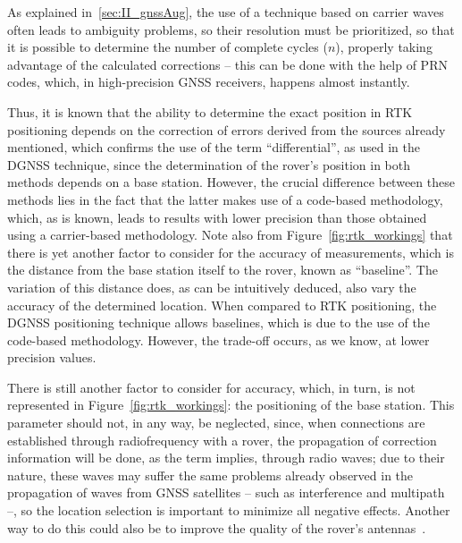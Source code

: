 As explained in~\ref{sec:II_gnssAug}, the use of a technique based on carrier waves often leads to ambiguity problems, so their resolution must be prioritized, so that it is possible to determine the number of complete cycles ($n$), properly taking advantage of the calculated corrections -- this can be done with the help of PRN codes, which, in high-precision GNSS receivers, happens almost instantly.

Thus, it is known that the ability to determine the exact position in RTK positioning depends on the correction of errors derived from the sources already mentioned, which confirms the use of the term ``differential'', as used in the DGNSS technique, since the determination of the rover's position in both methods depends on a base station. However, the crucial difference between these methods lies in the fact that the latter makes use of a code-based methodology, which, as is known, leads to results with lower precision than those obtained using a carrier-based methodology. Note also from Figure~\ref{fig:rtk_workings} that there is yet another factor to consider for the accuracy of measurements, which is the distance from the base station itself to the rover, known as ``baseline''. The variation of this distance does, as can be intuitively deduced, also vary the accuracy of the determined location. When compared to RTK positioning, the DGNSS positioning technique allows baselines, which is due to the use of the code-based methodology. However, the trade-off occurs, as we know, at lower precision values.

There is still another factor to consider for accuracy, which, in turn, is not represented in Figure~\ref{fig:rtk_workings}: the positioning of the base station. This parameter should not, in any way, be neglected, since, when connections are established through radiofrequency with a rover, the propagation of correction information will be done, as the term implies, through radio waves; due to their nature, these waves may suffer the same problems already observed in the propagation of waves from GNSS satellites -- such as interference and multipath --, so the location selection is important to minimize all negative effects. Another way to do this could also be to improve the quality of the rover's antennas~\cite{novatel_gnss,ayers_geosystems_2011,8093778,9292033}.


